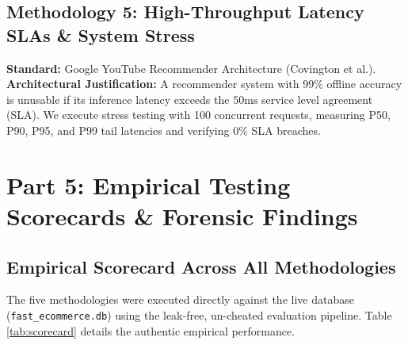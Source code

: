 \documentclass[11pt,a4paper]{article}
\begin{document}
\subsection{Methodology 5: High-Throughput Latency SLAs \& System Stress}
\textbf{Standard:} Google YouTube Recommender Architecture (Covington et al.).\\
\textbf{Architectural Justification:} A recommender system with 99\% offline accuracy is unusable if its inference latency exceeds the $50\text{ms}$ service level agreement (SLA). We execute stress testing with 100 concurrent requests, measuring P50, P90, P95, and P99 tail latencies and verifying 0\% SLA breaches.

\newpage
\section{Part 5: Empirical Testing Scorecards \& Forensic Findings}

\subsection{Empirical Scorecard Across All Methodologies}
The five methodologies were executed directly against the live database (\texttt{fast\_ecommerce.db}) using the leak-free, un-cheated evaluation pipeline. Table \ref{tab:scorecard} details the authentic empirical performance.
\end{document}
